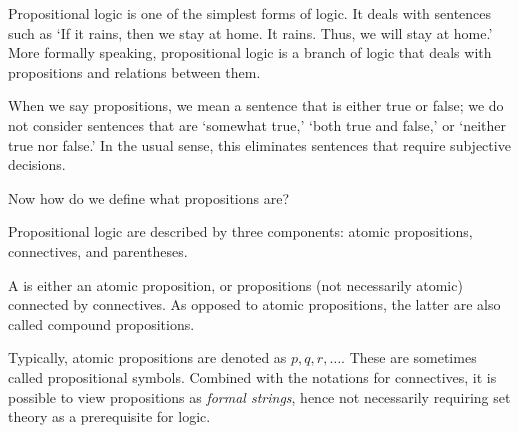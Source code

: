  \label{sec:plogic}

Propositional logic is one of the simplest forms of logic.
It deals with sentences such as
`If it rains, then we stay at home.
It rains.
Thus, we will stay at home.'
More formally speaking,
propositional logic is a branch of logic that deals with
propositions
and relations between them.

When we say propositions,
we mean a sentence that is either true or false;
we do not consider sentences that are
`somewhat true,'
`both true and false,'
or `neither true nor false.'
In the usual sense,
this eliminates sentences that require subjective decisions.

Now how do we define what propositions are?

\begin{definition}
    \label{def:propformula}
    Propositional logic are described by three components:
    atomic propositions,
    connectives,
    and parentheses.

    A  is either
    an atomic proposition,
    or propositions (not necessarily atomic) connected by connectives.
    As opposed to atomic propositions,
    the latter are also called compound propositions.
\end{definition}

\begin{remark}
    Typically, atomic propositions are denoted as \(p,q,r,\ldots\).
    These are sometimes called propositional symbols.
    Combined with the notations for connectives,
    it is possible to view propositions as \emph{formal strings},
    hence not necessarily requiring set theory
    as a prerequisite for logic.
\end{remark}

